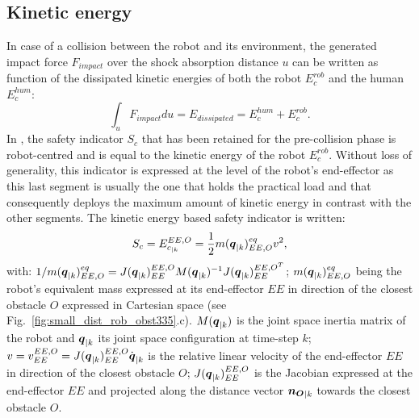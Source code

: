 \documentclass[letterpaper, 10 pt, conference]{ieeeconf}      %
\newcommand{\vect}[1]{\mbox{\boldmath${#1}$}}%
\begin{document}
\subsection{Kinetic energy}
In case of a collision between the robot and its environment, the generated impact force $F_{impact}$ over the shock absorption distance $u$ can be written as function of the dissipated kinetic energies of both the robot $E_{c}^{rob}$ and the human $E_{c}^{hum}$:
\begin{equation}
\int_u F_{impact} du  = E_{dissipated} = E_{c}^{hum} + E_{c}^{rob}.
\label{eq:Energydissipationmodel1}
\end{equation}
In \cite{meguenani2015control}, the safety indicator $S_c$ that has been retained for the pre-collision phase is robot-centred and is equal to the kinetic energy of the robot $E_{c}^{rob}$. Without loss of generality, this indicator is expressed at the level of the robot's end-effector as  this last segment is usually the one that holds the practical load and that consequently deploys the maximum amount of kinetic energy in contrast with the other segments. The kinetic energy based safety indicator is written: 
\begin{equation}
S_c = E_{c_{|k}}^{EE,O} = \frac{1}{2} m(\vect{q}_{|k})_{EE,O}^{eq} v^2,
\label{eq:Ec_constr_first}
\end{equation}
with: $1/m(\vect{q}_{|k})_{EE,O}^{eq}  = J(\vect{q}_{|k})_{EE}^{EE,O} M(\vect{q}_{|k})^{-1} J(\vect{q}_{|k})_{EE}^{{EE,O}^T}$; $m(\vect{q}_{|k})_{EE,O}^{eq}$ being the robot's equivalent mass expressed at its end-effector $EE$ in direction of the closest obstacle $O$ expressed in Cartesian space \cite{khatib1995inertial} (see Fig.~\ref{fig:small_dist_rob_obst335}.c). $M(\vect{q}_{|k})$ is the joint space inertia matrix of the robot and $\vect{q}_{|k}$ its joint space configuration at time-step $k$; $v=v_{EE}^{EE,O} = J(\vect{q}_{|k})_{EE}^{EE,O} \dot{\vect{q}}_{|k}$ is the relative linear velocity of the end-effector $EE$ in direction of the closest obstacle $O$; $J(\vect{q}_{|k})_{EE}^{EE,O}$ is the Jacobian expressed at the end-effector $EE$ and projected along the distance vector $\vect{n_O}_{|k}$  towards the closest obstacle $O$. 
\end{document}
